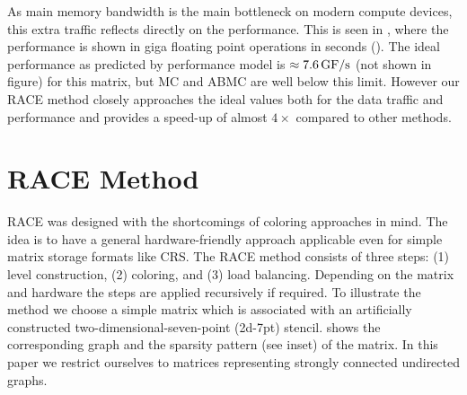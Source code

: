 As main memory bandwidth is the main bottleneck on modern compute devices,
 this extra traffic reflects directly on the performance.
This is seen in , where the performance is
shown in giga floating point operations in seconds (\GF). The ideal 
 performance as predicted by performance model is $\approx 7.6\,\mbox{GF/s}$ (not shown in figure)
 for this matrix, but \acrshort{MC} and \acrshort{ABMC} are well below this limit.
 However our \acrshort{RACE} method closely approaches the ideal values both for
 the data traffic and performance and provides a speed-up 
of almost  $4\times$ compared to other methods.

\section{RACE Method} \label{sec:RACE_method}
\acrshort{RACE} was designed with the shortcomings
of coloring approaches in mind. The idea is to have a general hard\-ware-friendly
approach applicable even for simple matrix storage formats 
like \acrshort{CRS}.
The \Acrshort{RACE} method consists of three steps: (1) level construction,
(2) \DK coloring, and (3) load balancing.
Depending on the matrix and hardware the steps are applied recursively 
if required. 
To illustrate the method we choose a
simple matrix which is associated with an artificially constructed
two-dimensional-seven-point (2d-7pt) stencil.  shows
the corresponding graph and the sparsity pattern (see inset) of the matrix.
In this paper we restrict ourselves to matrices representing strongly connected 
undirected graphs.

